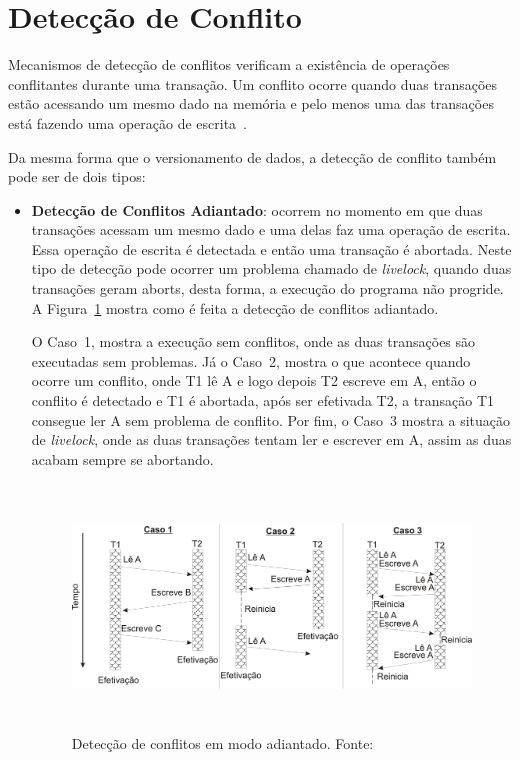 \documentclass[diss,capa]{texufpel}
\begin{document}
\section{Detecção de Conflito}

Mecanismos de detecção de conflitos verificam a existência de operações conflitantes durante uma transação. Um conflito ocorre quando duas transações estão acessando um mesmo dado na memória e pelo menos uma das transações está fazendo uma operação de escrita~\cite{BaldassinTese2009}.

Da mesma forma que o versionamento de dados, a detecção de conflito também pode ser de dois tipos:

\begin{itemize}
\item \textbf{Detecção de Conflitos Adiantado}: ocorrem no momento em que duas transações acessam um mesmo dado e uma delas faz uma operação de escrita. Essa operação de escrita é detectada e então uma transação é abortada. Neste tipo de detecção pode ocorrer um problema chamado de \emph{livelock}, quando duas transações geram aborts, desta forma, a execução do programa não progride. A Figura~\ref{figuradeteccaoadiantado} mostra como é feita a detecção de conflitos adiantado.

O Caso~1, mostra a execução sem conflitos, onde as duas transações são executadas sem problemas. Já o Caso~2, mostra o que acontece quando ocorre um conflito, onde T1 lê A e logo depois T2 escreve em A, então o conflito é detectado e T1 é abortada, após ser efetivada T2, a transação T1 consegue ler A sem problema de conflito. Por fim, o Caso~3 mostra a situação de \emph{livelock}, onde as duas transações tentam ler e escrever em A, assim as duas acabam sempre se abortando.

\begin{figure}[!htp]
\centering
\includegraphics[height=6.5cm]{images/conflitoadiantado.png}
\caption{Detecção de conflitos em modo adiantado. Fonte:~\cite{rigotm}}
\label{figuradeteccaoadiantado}
\end{figure}



\end{itemize}
\end{document}
